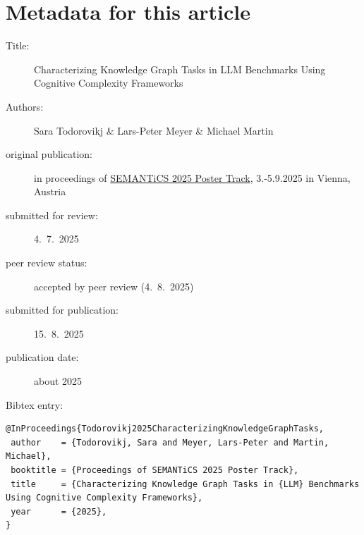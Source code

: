 \documentclass[
]{ceurart}
\begin{document}

\clearpage
\pagestyle{plain}
\cfoot*{} %

\section*{Metadata for this article}

\begin{description}
    \item[Title:] Characterizing Knowledge Graph Tasks in LLM Benchmarks Using Cognitive Complexity Frameworks
    \item[Authors:] Sara Todorovikj \& Lars-Peter Meyer \& Michael Martin
    \item[original publication:] in proceedings of \href{https://2025-eu.semantics.cc/page/posters}{SEMANTiCS 2025 Poster Track},
      3.-5.9.2025 in Vienna, Austria
    \item[submitted for review:] 4.~7.~2025
    \item[peer review status:] accepted by peer review (4.~8.~2025)
    \item[submitted for publication:] 15.~8.~2025
    \item[publication date:] about 2025
    \item[Bibtex entry:] 
\end{description}

\begin{scriptsize}
  \begin{verbatim}
@InProceedings{Todorovikj2025CharacterizingKnowledgeGraphTasks,
 author    = {Todorovikj, Sara and Meyer, Lars-Peter and Martin, Michael},
 booktitle = {Proceedings of SEMANTiCS 2025 Poster Track},
 title     = {Characterizing Knowledge Graph Tasks in {LLM} Benchmarks Using Cognitive Complexity Frameworks},
 year      = {2025},
}  
  \end{verbatim}
\end{scriptsize}
\end{document}
